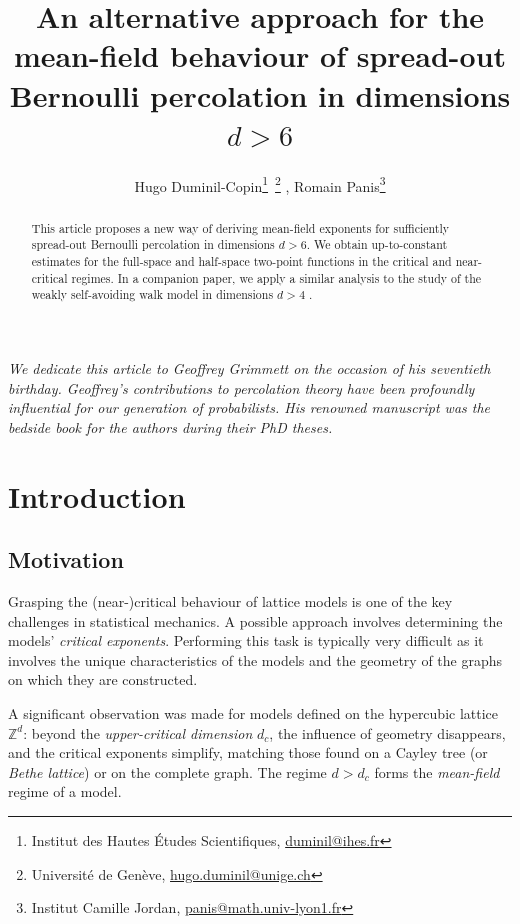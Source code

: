 \documentclass[11pt,a4paper]{article}
\title{An alternative approach for the mean-field behaviour of spread-out Bernoulli percolation in dimensions $d>6$}
\numberwithin{equation}{section}
\theoremstyle{plain}
\theoremstyle{definition}
\begin{document}
\author{Hugo Duminil-Copin\footnote{Institut des Hautes \'Etudes Scientifiques, \url{duminil@ihes.fr}}\ \footnotemark[2]\footnote{Université de Genève, \url{hugo.duminil@unige.ch}} , Romain Panis\footnotemark[3]\footnote{Institut Camille Jordan, \url{panis@math.univ-lyon1.fr}}}
\maketitle
{\em We dedicate this article to Geoffrey Grimmett on the occasion of his seventieth birthday. Geoffrey's contributions to percolation theory have been profoundly influential for our generation of probabilists. His renowned manuscript was the bedside book for the authors during their PhD theses. 
}

\begin{abstract}
This article proposes a new way of deriving mean-field exponents for sufficiently spread-out Bernoulli percolation in dimensions $d>6$. We obtain up-to-constant estimates for the full-space and half-space two-point functions in the critical and near-critical regimes. In a companion paper, we apply a similar analysis to the study of the weakly self-avoiding walk model in dimensions $d>4$ \cite{DumPan24WSAW}.
\end{abstract}

\section{Introduction}

\subsection{Motivation}

Grasping the (near-)critical behaviour of lattice models is one of the key challenges in statistical mechanics. A possible approach involves determining the models' \emph{critical exponents}. Performing this task is typically very difficult as it involves the unique characteristics of the models and the geometry of the graphs on which they are constructed.

A significant observation was made for models defined on the hypercubic lattice $\mathbb{Z}^d$: beyond the \emph{upper-critical dimension} $d_c$, the influence of geometry disappears, and the critical exponents simplify, matching those found on a Cayley tree (or \emph{Bethe lattice}) or on the complete graph. The regime $d>d_c$ forms the \emph{mean-field} regime of a model. 
\end{document}
